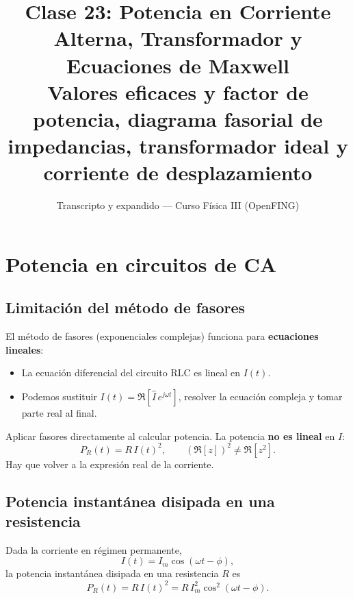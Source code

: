 \documentclass[12pt,a4paper]{article}
\title{\textbf{Clase 23: Potencia en Corriente Alterna, Transformador
        y Ecuaciones de Maxwell}\\[0.3em]
        \large{Valores eficaces y factor de potencia, diagrama fasorial de
              impedancias, transformador ideal y corriente de desplazamiento}}
\author{Transcripto y expandido --- Curso Física III (OpenFING)}
\date{}
\begin{document}
\maketitle
\thispagestyle{empty}
\newpage

\tableofcontents
\newpage

\section{Potencia en circuitos de CA}

\subsection{Limitación del método de fasores}

El método de fasores (exponenciales complejas) funciona para
\textbf{ecuaciones lineales}:

\begin{itemize}
  \item La ecuación diferencial del circuito RLC es lineal en
        \(I(t)\).
  \item Podemos sustituir
        \(I(t) = \Re[\hat{I}\, e^{j\omega t}]\), resolver la
        ecuación compleja y tomar parte real al final.
\end{itemize}

\begin{warnbox}
  Aplicar fasores directamente al calcular potencia. La potencia
  \textbf{no es lineal} en \(I\):
  \[
  P_R(t) = R\, I(t)^2,\qquad
  (\Re[z])^2 \neq \Re[z^2].
  \]
  Hay que volver a la expresión real de la corriente.
\end{warnbox}

\subsection{Potencia instantánea disipada en una resistencia}

Dada la corriente en régimen permanente,
\[
I(t) = I_m \cos(\omega t - \phi),
\]
la potencia instantánea disipada en una resistencia \(R\) es
\[
P_R(t) = R\, I(t)^2 = R\, I_m^2 \cos^2(\omega t - \phi).
\]
\end{document}
